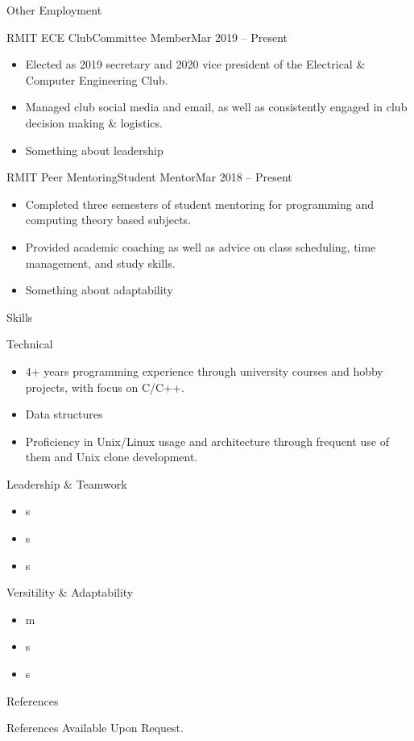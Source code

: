 \documentclass[]{mcdowellcv}
\begin{document}
	\begin{cvsection}{Other Employment}
		\begin{cvsubsection}{RMIT ECE Club}{Committee Member}{Mar 2019 -- Present}
			\begin{itemize}
				\item Elected as 2019 secretary and 2020 vice president of the Electrical \& Computer Engineering Club.
				\item Managed club social media and email, as well as consistently engaged in club decision making \& logistics.
				\item Something about leadership
			\end{itemize}
		\end{cvsubsection}

		\begin{cvsubsection}{RMIT Peer Mentoring}{Student Mentor}{Mar 2018 -- Present}
			\begin{itemize}
				\item Completed three semesters of student mentoring for programming and computing theory based subjects.
				\item Provided academic coaching as well as advice on class scheduling, time management, and study skills.
				\item Something about adaptability
			\end{itemize}
		\end{cvsubsection}
	\end{cvsection}

	\begin{cvsection}{Skills}
		\begin{cvsubsection}{Technical}{}{}
			\begin{itemize}
				\item 4+ years programming experience through university courses and hobby projects, with focus on C/C++.
				\item Data structures
				\item Proficiency in Unix/Linux usage and architecture through frequent use of them and Unix clone development.
			\end{itemize}
		\end{cvsubsection}
		\begin{cvsubsection}{Leadership \& Teamwork}{}{}
			\begin{itemize}
				\item s
				\item s
				\item s
			\end{itemize}
		\end{cvsubsection}
		\begin{cvsubsection}{Versitility \& Adaptability}{}{}
			\begin{itemize}
				\item m
				\item s
				\item s
			\end{itemize}
		\end{cvsubsection}
	\end{cvsection}

	\begin{cvsection}{References}
		\begin{cvsubsection}{}{}{}
			References Available Upon Request.
		\end{cvsubsection}
	\end{cvsection}
\end{document}
